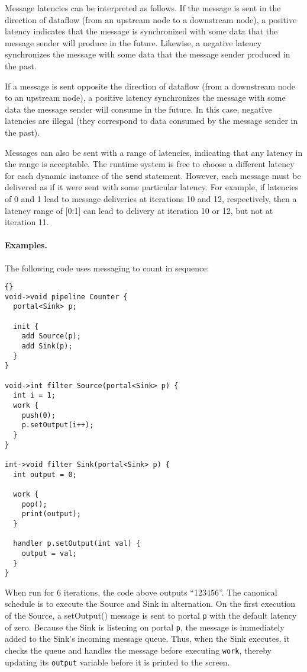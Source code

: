 Message latencies can be interpreted as follows.  If the message is
sent in the direction of dataflow (from an upstream node to a
downstream node), a positive latency indicates that the message is
synchronized with some data that the message sender will produce in
the future.  Likewise, a negative latency synchronizes the message
with some data that the message sender produced in the past.

If a message is sent opposite the direction of dataflow (from a
downstream node to an upstream node), a positive latency synchronizes
the message with some data the message sender will consume in the
future.  In this case, negative latencies are illegal (they correspond
to data consumed by the message sender in the past).

Messages can also be sent with a range of latencies, indicating that
any latency in the range is acceptable.  The runtime system is free to
choose a different latency for each dynamic instance of the
\lstinline|send| statement.  However, each message must be delivered 
as if it were sent with some particular latency.  For example, if
latencies of 0 and 1 lead to message deliveries at iterations 10 and
12, respectively, then a latency range of [0:1] can lead to delivery
at iteration 10 or 12, but not at iteration 11.

\paragraph{Examples.}

The following code uses messaging to count in sequence:

\begin{lstlisting}{}
void->void pipeline Counter {
  portal<Sink> p;

  init {
    add Source(p);
    add Sink(p);
  }
}

void->int filter Source(portal<Sink> p) {
  int i = 1;
  work {
    push(0);
    p.setOutput(i++);
  }
}

int->void filter Sink(portal<Sink> p) {
  int output = 0;

  work {
    pop();
    print(output);
  }

  handler p.setOutput(int val) {
    output = val;
  }
}
\end{lstlisting}{}

When run for 6 iterations, the code above outputs ``123456''.  The
canonical schedule is to execute the Source and Sink in alternation.
On the first execution of the Source, a setOutput() message is sent to
portal {\tt p} with the default latency of zero.  Because the Sink is
listening on portal {\tt p}, the message is immediately added to the
Sink's incoming message queue.  Thus, when the Sink executes, it
checks the queue and handles the message before executing {\tt work},
thereby updating its \lstinline|output| variable before it is printed
to the screen.

